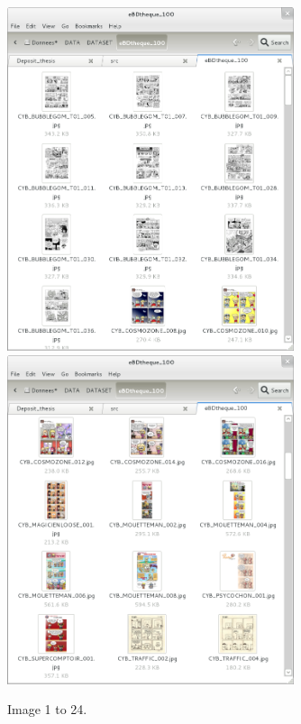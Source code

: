   \begin{figure}[h!]  %
    \centering
    \includegraphics[trim= 5px 10px 30px 152px, clip, width=0.75\textwidth]{thumb_01.png}\\
    \includegraphics[trim= 5px 10px 30px 152px, clip, width=0.75\textwidth]{thumb_02.png}
    
    \caption{Image 1 to 24.}
    \label{fig:app:1_2}
  \end{figure}

